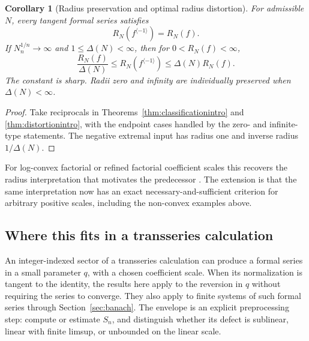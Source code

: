 \documentclass[11pt,a4paper]{article}
\numberwithin{equation}{section}
\newtheorem{corollary}[theorem]{Corollary}
\theoremstyle{definition}
\theoremstyle{remark}
\newcommand{\inv}[1]{#1^{\langle-1\rangle}}
\begin{document}
\begin{corollary}[Radius preservation and optimal radius distortion]
\label{cor:radii}
For admissible $N$, every tangent formal series satisfies
\begin{equation}
 R_N(\inv f)=R_N(f).
 \label{eq:radiusinvariance}
\end{equation}
If $N_n^{1/n}\to\infty$ and $1\le\Delta(N)<\infty$, then for
$0<R_N(f)<\infty$,
\begin{equation}
 \frac{R_N(f)}{\Delta(N)}\le R_N(\inv f)
                              \le\Delta(N)R_N(f).
 \label{eq:radiusdistortion}
\end{equation}
The constant is sharp. Radii zero and infinity are individually preserved
when $\Delta(N)<\infty$.
\end{corollary}
\begin{proof}
Take reciprocals in Theorems~\ref{thm:classificationintro} and
\ref{thm:distortionintro}, with the endpoint cases handled by the
zero- and infinite-type statements. The negative extremal input has
radius one and inverse radius $1/\Delta(N)$.
\end{proof}

For log-convex factorial or refined factorial coefficient scales this
recovers the radius interpretation that motivates the predecessor
\cite{repo-weight}. The extension is that the same interpretation now
has an exact necessary-and-sufficient criterion for arbitrary positive
scales, including the non-convex examples above.

\subsection{Where this fits in a transseries calculation}

An integer-indexed sector of a transseries calculation can produce a
formal series in a small parameter $q$, with a chosen coefficient scale.
When its normalization is tangent to the identity, the results here apply
to the reversion in $q$ without requiring the series to converge. They
also apply to finite systems of such formal series through
Section~\ref{sec:banach}. The envelope is an explicit preprocessing step:
compute or estimate $S_n$, and distinguish whether its defect is
sublinear, linear with finite limsup, or unbounded on the linear scale.
\end{document}
